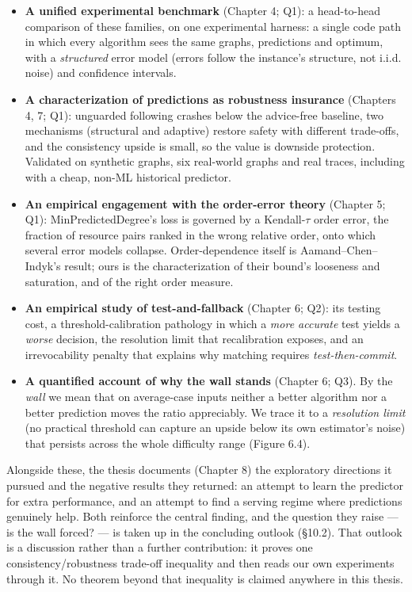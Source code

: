 \begin{itemize}
\item
  \textbf{A unified experimental benchmark} (Chapter 4; Q1): a
  head-to-head comparison of these families, on one experimental
  harness: a single code path in which every algorithm sees the same
  graphs, predictions and optimum, with a \emph{structured} error model
  (errors follow the instance's structure, not i.i.d. noise) and
  confidence intervals.
\item
  \textbf{A characterization of predictions as robustness insurance}
  (Chapters 4, 7; Q1): unguarded following crashes below the advice-free
  baseline, two mechanisms (structural and adaptive) restore safety with
  different trade-offs, and the consistency upside is small, so the
  value is downside protection. Validated on synthetic graphs, six
  real-world graphs and real traces, including with a cheap, non-ML
  historical predictor.
\item
  \textbf{An empirical engagement with the order-error theory} (Chapter
  5; Q1): MinPredictedDegree's loss is governed by a Kendall-\(\tau\)
  order error, the fraction of resource pairs ranked in the wrong
  relative order, onto which several error models collapse.
  Order-dependence itself is Aamand--Chen--Indyk's result; ours is the
  characterization of their bound's looseness and saturation, and of the
  right order measure.
\item
  \textbf{An empirical study of test-and-fallback} (Chapter 6; Q2): its
  testing cost, a threshold-calibration pathology in which a \emph{more
  accurate} test yields a \emph{worse} decision, the resolution limit
  that recalibration exposes, and an irrevocability penalty that
  explains why matching requires \emph{test-then-commit}.
\item
  \textbf{A quantified account of why the wall stands} (Chapter 6; Q3).
  By the \emph{wall} we mean that on average-case inputs neither a
  better algorithm nor a better prediction moves the ratio appreciably.
  We trace it to a \emph{resolution limit} (no practical threshold can
  capture an upside below its own estimator's noise) that persists
  across the whole difficulty range (Figure 6.4).
\end{itemize}

Alongside these, the thesis documents (Chapter 8) the exploratory
directions it pursued and the negative results they returned: an attempt
to learn the predictor for extra performance, and an attempt to find a
serving regime where predictions genuinely help. Both reinforce the
central finding, and the question they raise --- is the wall forced? ---
is taken up in the concluding outlook (§10.2). That outlook is a
discussion rather than a further contribution: it proves one
consistency/robustness trade-off inequality and then reads our own
experiments through it. No theorem beyond that inequality is claimed
anywhere in this thesis.

